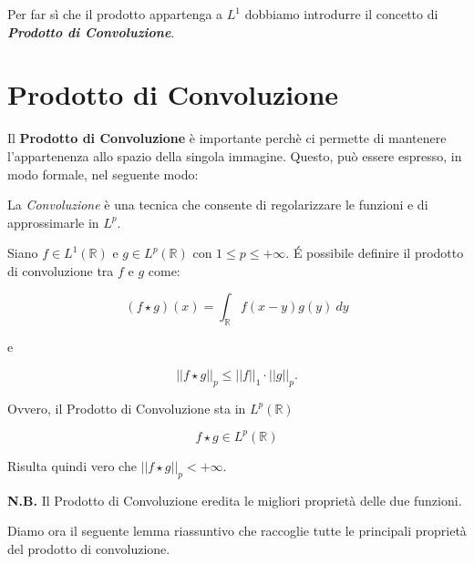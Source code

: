 \vspace{1cm}

Per far sì che il prodotto appartenga a $L^1$ dobbiamo introdurre il concetto di
\textit{\textbf{Prodotto di Convoluzione}}.

\section{Prodotto di Convoluzione}
Il \textbf{Prodotto di Convoluzione} è importante perchè ci permette di
mantenere l'appartenenza allo spazio della singola immagine. Questo, può essere
espresso, in modo formale, nel seguente modo:
\begin{center}
    La \textit{Convoluzione} è una tecnica che consente di regolarizzare le
    funzioni e di approssimarle in $L^p$.
\end{center}

\begin{definition}
    Siano $f \in L^1(\mathbb{R})$ e $g \in L^p(\mathbb{R})$ con $1 \leq p \leq
        +\infty$. \'E possibile definire il prodotto di convoluzione tra $f$ e
    $g$ come:
    
    $$
        \left( f \star g\right)(x) = \int_{\mathbb{R}} f(x - y) g(y) \ dy
    $$
    
    e
    
    $$
        ||f \star g||_p \leq ||f||_1 \cdot ||g||_p.
    $$
    
    Ovvero, il Prodotto di Convoluzione sta in $L^p (\mathbb{R})$
    
    $$f \star g \in L^p(\mathbb{R})
    $$
    
    Risulta quindi vero che $||f \star g||_p < +\infty$.
    
\end{definition}

\vspace{0.3cm}

\textbf{N.B.} Il Prodotto di Convoluzione eredita le migliori proprietà delle due
funzioni.

\vspace{1cm}

Diamo ora il seguente lemma riassuntivo che raccoglie tutte le principali
proprietà del prodotto di convoluzione.

